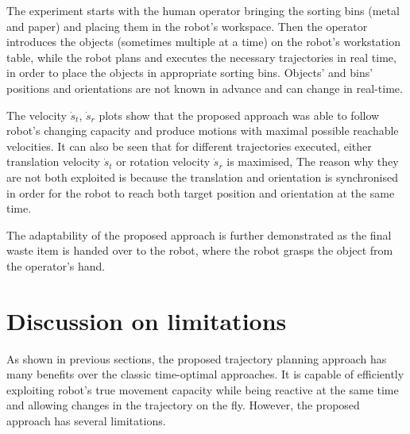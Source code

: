 The experiment starts with the human operator bringing the sorting bins (metal and paper) and placing them in the robot's workspace. Then the operator introduces the objects (sometimes multiple at a time) on the robot's workstation table, while the robot plans and executes the necessary trajectories in real time, in order to place the objects in appropriate sorting bins. Objects' and bins' positions and orientations are not known in advance and can change in real-time. 

The velocity $\dot{s}_t$, $\dot{s}_r$ plots show that the proposed approach was able to follow robot's changing capacity and produce motions with maximal possible reachable velocities. It can also be seen that for different trajectories executed, either translation velocity $\dot{s}_t$ or rotation velocity $\dot{s}_r$ is maximised, The reason why they are not both exploited is because the translation and orientation is synchronised in order for the robot to reach both target position and orientation at the same time.

The adaptability of the proposed approach is further demonstrated as the final waste item is handed over to the robot, where the robot grasps the object from the operator's hand. 


\section{Discussion on limitations}
\label{ch:discussion}

As shown in previous sections, the proposed trajectory planning approach has many benefits over the classic time-optimal approaches. It is capable of efficiently exploiting robot's true movement capacity while being reactive at the same time and allowing changes in the trajectory on the fly. However, the proposed approach has several limitations.

